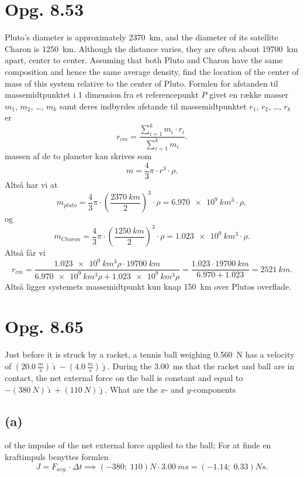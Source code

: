 \documentclass[12pt]{article}
\begin{document}
\section*{Opg. 8.53}
Pluto’s diameter is approximately \qty{2370}{km}, and the diameter of its satellite Charon is \qty{1250}{km}. Although the distance varies, they are often about \qty{19700}{km} apart, center to center. Assuming that both Pluto and Charon have the same composition and hence the same average density, find the location of the center of mass of this system relative to the center of Pluto.
\bigbreak
Formlen for afstanden til massemidtpunktet i 1 dimension fra et referencepunkt $P$ givet en række masser $m_1$,  $m_2$,  \ldots, $m_k$ samt deres indbyrdes afstande til massemidtpunktet $r_1$,  $r_2$,  \ldots, $r_k$ er
\[
r_{cm} = \frac{\sum_{i=1}^{k} m_i \cdot r_i}{\sum_{i=1}^{k} m_i}
.\] 
massen af de to planeter kan skrives som
\[
m = \frac{4}{3}\pi\cdot r^3 \cdot \rho
.\] 
Altså har vi at
\[
  m_{pluto} = \frac{4}{3}\pi\cdot \left( \frac{\qty{2370}{km}}{2} \right)^3 \cdot \rho = \qty{6,970e9}{km^3}\cdot \rho
,\] 
og
\[
m_{Charon} = \frac{4}{3}\pi\cdot \left( \frac{\qty{1250}{km}}{2} \right)^3 \cdot \rho = \qty{1,023e9}{km^3}\cdot \rho
.\] 
Altså får vi
\[
  r_{cm} = \frac{\qty{1,023e9}{km^3} \rho \cdot \qty{19700}{km}}{\qty{6,970e9}{km^3} \rho + \qty{1,023e9}{km^3}\rho} = \frac{\num{1,023}\cdot \qty{19700}{km}}{\num{6,970} + \num{1,023}} = \qty{2521}{km}
.\] 
Altså ligger systemets massemidtpunkt kun knap \qty{150}{km} over Plutos overflade.

\section*{Opg. 8.65}
Just before it is struck by a racket, a tennis ball weighing \qty{0,560}{N} has a velocity of $\left( \qty{20,0}{\frac{m}{s}} \right) \hat{\imath} - \left( \qty{4,0}{\frac{m}{s}} \right) \hat{\jmath}$. During the \qty{3,00}{ms} that the racket and ball are in contact, the net external force on the ball is constant and equal to $-\left( \qty{380}{N} \right) \hat{\imath} + \left( \qty{110}{N} \right) \hat{\jmath}$. What are the $x$- and $y$-components


\subsection*{(a)}
of the impulse of the net external force applied to the ball;
\bigbreak
For at finde en kraftimpuls benyttes formlen
\[
  J = F_{avg.}\cdot \Delta t \implies \left( \num{-380}; \; \num{110} \right)\unit{N} \cdot \qty{3,00}{ms} = \left(\num{-1,14}; \; \num{0,33} \right) \unit{Ns} 
.\] 
\end{document}
